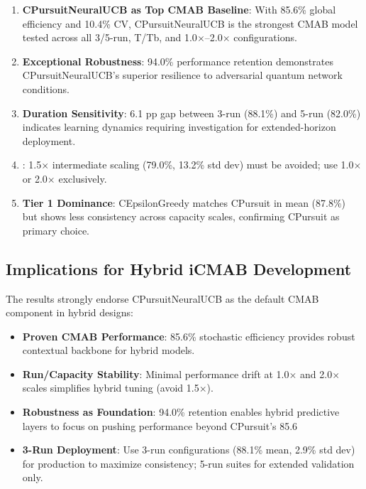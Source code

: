 \documentclass[12pt,a4paper]{article}
\newcommand{\primarytext}[1]{\textcolor{primaryblue}{\textbf{#1}}}
\newcommand{\success}[1]{\textcolor{accentgreen}{\textbf{#1}}}
\newcommand{\warning}[1]{\textcolor{warningred}{\textbf{#1}}}
\begin{document}
\begin{enumerate}
    \item \primarytext{CPursuitNeuralUCB as Top CMAB Baseline}: With 85.6\% global efficiency and 10.4\% CV, CPursuitNeuralUCB is the strongest CMAB model tested across all 3/5-run, T/Tb, and 1.0$\times$–2.0$\times$ configurations.
    
    \item \success{Exceptional Robustness}: 94.0\% performance retention demonstrates CPursuitNeuralUCB's superior resilience to adversarial quantum network conditions.
    
    \item \warning{Duration Sensitivity}: 6.1 pp gap between 3-run (88.1\%) and 5-run (82.0\%) indicates learning dynamics requiring investigation for extended-horizon deployment.
    
    \item {}: 1.5$\times$ intermediate scaling (79.0\%, 13.2\% std dev) must be avoided; use 1.0$\times$ or 2.0$\times$ exclusively.
    
    \item \success{Tier 1 Dominance}: CEpsilonGreedy matches CPursuit in mean (87.8\%) but shows less consistency across capacity scales, confirming CPursuit as primary choice.
\end{enumerate}

\subsection{Implications for Hybrid iCMAB Development}

The results strongly endorse CPursuitNeuralUCB as the default CMAB component in hybrid designs:

\begin{itemize}
    \item \textbf{Proven CMAB Performance}: 85.6\% stochastic efficiency provides robust contextual backbone for hybrid models.
    
    \item \textbf{Run/Capacity Stability}: Minimal performance drift at 1.0$\times$ and 2.0$\times$ scales simplifies hybrid tuning (avoid 1.5$\times$).
    
    \item \textbf{Robustness as Foundation}: 94.0\% retention enables hybrid predictive layers to focus on pushing performance beyond CPursuit's 85.6%
    
    \item \textbf{3-Run Deployment}: Use 3-run configurations (88.1\% mean, 2.9\% std dev) for production to maximize consistency; 5-run suites for extended validation only.
\end{itemize}
\end{document}
